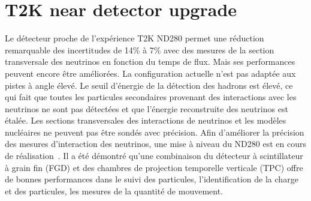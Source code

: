 \documentclass[../main.tex]{subfiles}
\begin{document}
\setcounter{section}{1}
\section*{T2K near detector upgrade}

Le détecteur proche de l'expérience T2K ND280 permet une réduction remarquable des incertitudes de 14\% à 7\% avec des mesures de la section transversale des neutrinos en fonction du temps de flux. Mais ses performances peuvent encore être améliorées. La configuration actuelle n'est pas adaptée aux pistes à angle élevé. Le seuil d'énergie de la détection des hadrons est élevé, ce qui fait que toutes les particules secondaires provenant des interactions avec les neutrinos ne sont pas détectées et que l'énergie reconstruite des neutrinos est étalée. Les sections transversales des interactions de neutrinos et les modèles nucléaires ne peuvent pas être sondés avec précision. Afin d'améliorer la précision des mesures d'interaction des neutrinos, une mise à niveau du ND280 est en cours de réalisation~\cite{Abe2019}. Il a été démontré qu'une combinaison du détecteur à scintillateur à grain fin (FGD) et des chambres de projection temporelle verticale (TPC) offre de bonnes performances dans le suivi des particules, l'identification de la charge et des particules, les mesures de la quantité de mouvement.

\end{document}
